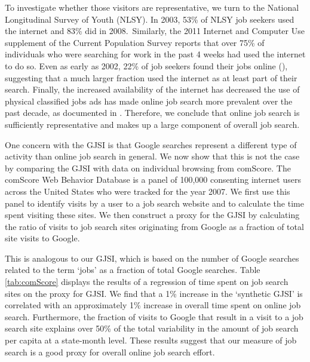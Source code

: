 \documentclass[12pt]{article}
\begin{document}
\begin{spacing}{2}
To investigate whether those visitors are representative, we turn to the National Longitudinal Survey of Youth (NLSY). In 2003, 53\% of NLSY job seekers used the internet and 83\% did in 2008.\footnotemark \ Similarly, the 2011 Internet and Computer Use supplement of the Current Population Survey reports that over 75\% of individuals who were searching for work in the past 4 weeks had used the internet to do so. Even as early as 2002, 22\% of job seekers found their jobs online (\citet{Stevenson2009}), suggesting that a much larger fraction used the internet as at least part of their search. Finally, the increased availability of the internet has decreased the use of physical classified jobs ads has made online job search more prevalent over the past decade, as documented in \citet{Kroft2011a}. Therefore, we conclude that online job search is sufficiently representative and makes up a large component of overall job search.

One concern with the GJSI is that Google searches represent a different type of activity than online job search in general. We now show that this is not the case by comparing the GJSI with data on individual browsing from comScore. The comScore Web Behavior Database is a panel of 100,000 consenting internet users across the United States who were tracked for the year 2007. We first use this panel to identify visits by a user to a job search website and to calculate the time spent visiting these sites.\footnotemark{} We then construct a proxy for the GJSI by calculating the ratio of visits to job search sites originating from Google as a fraction of total site visits to Google.

This is analogous to our GJSI, which is based on the number of Google searches related to the term `jobs' as a fraction of total Google searches. Table \ref{tab:comScore} displays the results of a regression of time spent on job search sites on the proxy for GJSI. We find that a 1\% increase in the `synthetic GJSI' is correlated with an approximately 1\% increase in overall time spent on online job search. Furthermore, the fraction of visits to Google that result in a visit to a job search site explains over 50\% of the total variability in the amount of job search per capita at a state-month level. These results suggest that our measure of job search is a good proxy for overall online job search effort.


\end{spacing}
\end{document}
